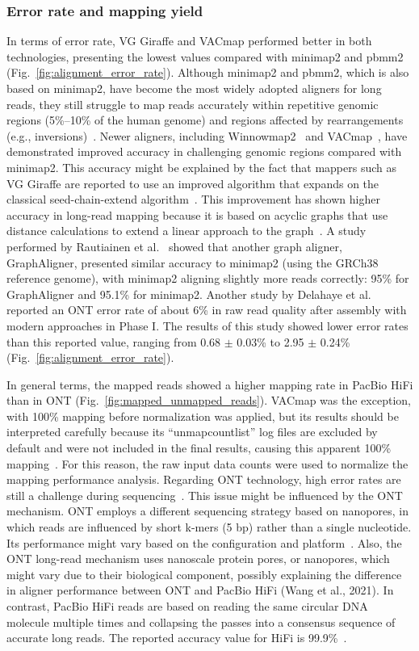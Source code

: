 \documentclass[12pt, letterpaper]{article}
\begin{document}
\subsubsection{Error rate and mapping yield}
In terms of error rate, VG Giraffe and VACmap performed better in both technologies, presenting the lowest values compared with minimap2 and pbmm2 (Fig.~\ref{fig:alignment_error_rate}). Although minimap2 and pbmm2, which is also based on minimap2, have become the most widely adopted aligners for long reads, they still struggle to map reads accurately within repetitive genomic regions (5\%–10\% of the human genome) and regions affected by rearrangements (e.g., inversions)~\cite{vacmap2025}. Newer aligners, including Winnowmap2~\cite{Jain2022} and VACmap~\cite{vacmap2025}, have demonstrated improved accuracy in challenging genomic regions compared with minimap2. This accuracy might be explained by the fact that mappers such as VG Giraffe are reported to use an improved algorithm that expands on the classical seed-chain-extend algorithm~\cite{Chang2025}. This improvement has shown higher accuracy in long-read mapping because it is based on acyclic graphs that use distance calculations to extend a linear approach to the graph~\cite{Chang2025}. A study performed by Rautiainen et al.~\cite{Rautiainen2020} showed that another graph aligner, GraphAligner, presented similar accuracy to minimap2 (using the GRCh38 reference genome), with minimap2 aligning slightly more reads correctly: 95\% for GraphAligner and 95.1\% for minimap2. Another study by Delahaye et al.~\cite{Delahaye2021} reported an ONT error rate of about 6\% in raw read quality after assembly with modern approaches in Phase I. The results of this study showed lower error rates than this reported value, ranging from 0.68 $\pm$ 0.03\% to 2.95 $\pm$ 0.24\% (Fig.~\ref{fig:alignment_error_rate}).

In general terms, the mapped reads showed a higher mapping rate in PacBio HiFi than in ONT (Fig.~\ref{fig:mapped_unmapped_reads}). VACmap was the exception, with 100\% mapping before normalization was applied, but its results should be interpreted carefully because its ``unmapcountlist'' log files are excluded by default and were not included in the final results, causing this apparent 100\% mapping~\cite{vacmap2025}. For this reason, the raw input data counts were used to normalize the mapping performance analysis. Regarding ONT technology, high error rates are still a challenge during sequencing~\cite{Zhang2022}. This issue might be influenced by the ONT mechanism. ONT employs a different sequencing strategy based on nanopores, in which reads are influenced by short k-mers (5 bp) rather than a single nucleotide. Its performance might vary based on the configuration and platform~\cite{Zheng2026}. Also, the ONT long-read mechanism uses nanoscale protein pores, or nanopores, which might vary due to their biological component, possibly explaining the difference in aligner performance between ONT and PacBio HiFi (Wang et al., 2021). In contrast, PacBio HiFi reads are based on reading the same circular DNA molecule multiple times and collapsing the passes into a consensus sequence of accurate long reads. The reported accuracy value for HiFi is 99.9\%~\cite{Zheng2026}.
\end{document}
